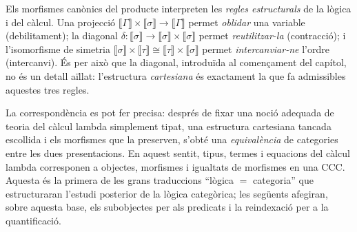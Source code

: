 \begin{observacio}
Els morfismes canònics del producte interpreten les \emph{regles estructurals} de la lògica i del càlcul. Una projecció $\llbracket\Gamma\rrbracket\times\llbracket\sigma\rrbracket\to\llbracket\Gamma\rrbracket$ permet \emph{oblidar} una variable (debilitament); la diagonal $\delta\colon\llbracket\sigma\rrbracket\to\llbracket\sigma\rrbracket\times\llbracket\sigma\rrbracket$ permet \emph{reutilitzar-la} (contracció); i l'isomorfisme de simetria $\llbracket\sigma\rrbracket\times\llbracket\tau\rrbracket\cong\llbracket\tau\rrbracket\times\llbracket\sigma\rrbracket$ permet \emph{intercanviar-ne} l'ordre (intercanvi). És per això que la diagonal, introduïda al començament del capítol, no és un detall aïllat: l'estructura \emph{cartesiana} és exactament la que fa admissibles aquestes tres regles.
\end{observacio}

\begin{observacio}
La correspondència es pot fer precisa: després de fixar una noció adequada de teoria del càlcul lambda simplement tipat, una estructura cartesiana tancada escollida i els morfismes que la preserven, s'obté una \emph{equivalència} de categories entre les dues presentacions. En aquest sentit, tipus, termes i equacions del càlcul lambda corresponen a objectes, morfismes i igualtats de morfismes en una CCC. Aquesta és la primera de les grans traduccions \enquote{lògica $=$ categoria} que estructuraran l'estudi posterior de la lògica categòrica; les següents afegiran, sobre aquesta base, els subobjectes per als predicats i la reindexació per a la quantificació.
\end{observacio}

